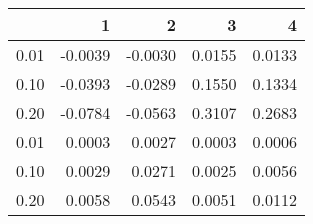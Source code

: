 \begin{tabular}{lrrrr}
\toprule
{} &       1 &       2 &       3 &       4 \\
\midrule
0.01 & -0.0039 & -0.0030 &  0.0155 &  0.0133 \\
0.10 & -0.0393 & -0.0289 &  0.1550 &  0.1334 \\
0.20 & -0.0784 & -0.0563 &  0.3107 &  0.2683 \\
0.01 &  0.0003 &  0.0027 &  0.0003 &  0.0006 \\
0.10 &  0.0029 &  0.0271 &  0.0025 &  0.0056 \\
0.20 &  0.0058 &  0.0543 &  0.0051 &  0.0112 \\
\bottomrule
\end{tabular}
